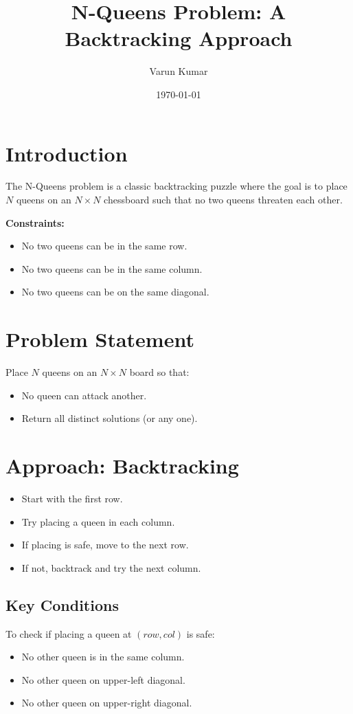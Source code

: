 \documentclass[14pt]{extarticle}
\title{N-Queens Problem: A Backtracking Approach}
\author{Varun Kumar}
\date{\today}
\begin{document}
\maketitle
\newpage
\tableofcontents
\newpage
\lstlistoflistings
\listofalgorithms
\newpage

\section{Introduction}
The N-Queens problem is a classic backtracking puzzle where the goal is to place $N$ queens on an $N \times N$ chessboard such that no two queens threaten each other.

\textbf{Constraints:}
\begin{itemize}
    \item No two queens can be in the same row.
    \item No two queens can be in the same column.
    \item No two queens can be on the same diagonal.
\end{itemize}

\section{Problem Statement}
Place $N$ queens on an $N \times N$ board so that:
\begin{itemize}
    \item No queen can attack another.
    \item Return all distinct solutions (or any one).
\end{itemize}

\section{Approach: Backtracking}
\begin{itemize}
    \item Start with the first row.
    \item Try placing a queen in each column.
    \item If placing is safe, move to the next row.
    \item If not, backtrack and try the next column.
\end{itemize}

\subsection*{Key Conditions}
To check if placing a queen at $(row, col)$ is safe:
\begin{itemize}
    \item No other queen is in the same column.
    \item No other queen on upper-left diagonal.
    \item No other queen on upper-right diagonal.
\end{itemize}
\end{document}
